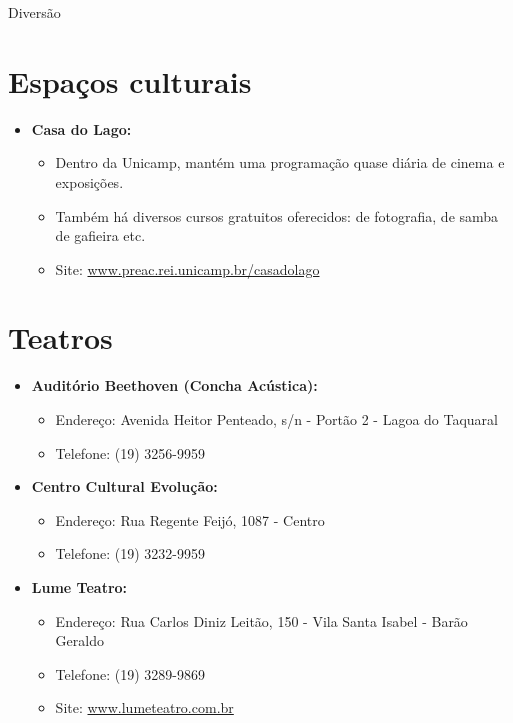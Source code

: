
\begin{story}{Diversão}

\section*{Espaços culturais}

\begin{itemize}

\item \textbf{Casa do Lago:}
\begin{itemize}
\item Dentro da Unicamp, mantém uma programação quase diária de cinema e exposições.
\item Também há diversos cursos gratuitos oferecidos: de fotografia, de samba de gafieira etc.
\item Site: \url{www.preac.rei.unicamp.br/casadolago}
\end{itemize}

\end{itemize}

\section*{Teatros}

\begin{itemize}

\item \textbf{Auditório Beethoven (Concha Acústica):}
\begin{itemize}
\item Endereço: Avenida Heitor Penteado, s/n - Portão 2 - Lagoa do Taquaral
\item Telefone: (19) 3256-9959
\end{itemize}

\item \textbf{Centro Cultural Evolução:}
\begin{itemize}
\item Endereço: Rua Regente Feijó, 1087 - Centro
\item Telefone: (19) 3232-9959 
\end{itemize}

\item \textbf{Lume Teatro:}
\begin{itemize}
\item Endereço: Rua Carlos Diniz Leitão, 150 - Vila Santa Isabel - Barão Geraldo
\item Telefone: (19) 3289-9869
\item Site: \url{www.lumeteatro.com.br} 
\end{itemize}


\end{itemize}
\end{story}
